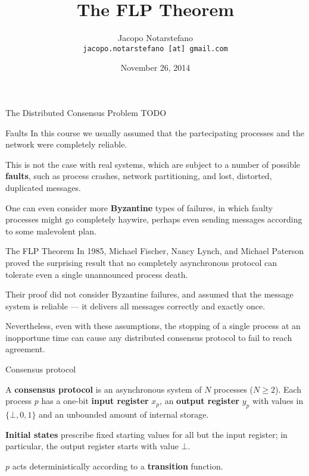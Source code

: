 \documentclass[12pt]{beamer}
\title{The FLP Theorem}
\author[Jacopo Notarstefano]{
  Jacopo Notarstefano\\
  \texttt{jacopo.notarstefano [at] gmail.com}
}
\date{November 26, 2014}
\begin{document}
  \begin{frame}[plain]
    \titlepage
  \end{frame}

  \begin{frame}{The Distributed Consensus Problem}
    TODO
  \end{frame}

  \begin{frame}{Faults}
    In this course we usually assumed that the partecipating processes and the network were completely reliable.

    \vspace{0.25cm}

    This is not the case with real systems, which are subject to a number of possible \textbf{faults}, such as process crashes, network partitioning, and lost, distorted, duplicated messages.

    \vspace{0.25cm}

    One can even consider more \textbf{Byzantine} types of failures, in which faulty processes might go completely haywire, perhaps even sending messages according to some malevolent plan.
  \end{frame}

  \begin{frame}{The FLP Theorem}
    In 1985, Michael Fischer, Nancy Lynch, and Michael Paterson proved the surprising result that no completely asynchronous protocol can tolerate even a single unannounced process death.

    \vspace{0.25cm}

    Their proof did not consider Byzantine failures, and assumed that the message system is reliable — it delivers all messages correctly and exactly once.

    \vspace{0.25cm}

    Nevertheless, even with these assumptions, the stopping of a single process at an inopportune time can cause any distributed consensus protocol to fail to reach agreement.
  \end{frame}

  \begin{frame}{Consensus protocol}
    \begin{definition}
      A \textbf{consensus protocol} is an asynchronous system of \(N\) processes (\(N\ge 2\)). Each process \(p\) has a one-bit \textbf{input register} \(x_p\), an \textbf{output register} \(y_p\) with values in \(\{\bot, 0, 1\}\) and an unbounded amount of internal storage.
    \end{definition}

    \vspace{0.25cm}

    \textbf{Initial states} prescribe fixed starting values for all but the input register; in particular, the output register starts with value \(\bot\).

    \vspace{0.25cm}

    \(p\) acts deterministically according to a \textbf{transition} function.
  \end{frame}
\end{document}
